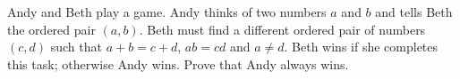 Andy and Beth play a game. Andy thinks of two numbers $a$ and $b$ and tells Beth the ordered pair $(a,b)$. Beth must find a different ordered pair of numbers $(c,d)$ such that $a+b=c+d$, $ab=cd$ and $a\ne d$. Beth wins if she completes this task; otherwise Andy wins. Prove that Andy always wins.
